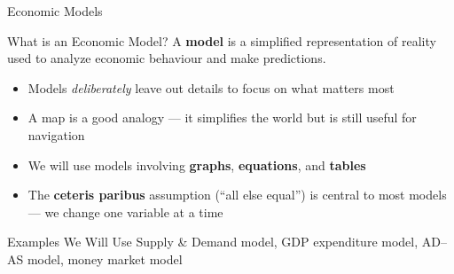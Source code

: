 \documentclass[aspectratio=169]{beamer}
\begin{document}
\begin{frame}{Economic Models}

\begin{block}{What is an Economic Model?}
  A \textbf{model} is a simplified representation of reality used to analyze economic behaviour and make predictions.
\end{block}
\vspace{0.3em}
\begin{itemize}
  \item Models \textit{deliberately} leave out details to focus on what matters most
  \item A map is a good analogy --- it simplifies the world but is still useful for navigation
  \item We will use models involving \textbf{graphs}, \textbf{equations}, and \textbf{tables}
  \item The \textbf{ceteris paribus} assumption (``all else equal'') is central to most models --- we change one variable at a time
\end{itemize}
\vspace{0.3em}
\begin{block}{Examples We Will Use}
  Supply \& Demand model, GDP expenditure model, AD--AS model, money market model
\end{block}
\end{frame}
\end{document}
